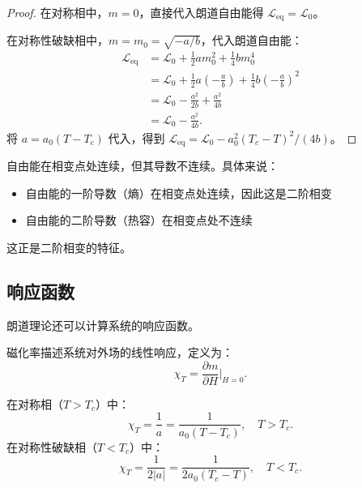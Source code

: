 \begin{proof}
在对称相中，$m = 0$，直接代入朗道自由能得 $\mathcal{L}_{\text{eq}} = \mathcal{L}_0$。

在对称性破缺相中，$m = m_0 = \sqrt{-a/b}$，代入朗道自由能：
\begin{align}
    \mathcal{L}_{\text{eq}} &= \mathcal{L}_0 + \frac{1}{2}a m_0^2 + \frac{1}{4}b m_0^4 \nonumber \\
    &= \mathcal{L}_0 + \frac{1}{2}a \left(-\frac{a}{b}\right) + \frac{1}{4}b \left(-\frac{a}{b}\right)^2 \nonumber \\
    &= \mathcal{L}_0 - \frac{a^2}{2b} + \frac{a^2}{4b} \nonumber \\
    &= \mathcal{L}_0 - \frac{a^2}{4b}.
\end{align}
将 $a = a_0(T - T_c)$ 代入，得到 $\mathcal{L}_{\text{eq}} = \mathcal{L}_0 - a_0^2(T_c - T)^2/(4b)$。
\end{proof}

\begin{note}
自由能在相变点处连续，但其导数不连续。具体来说：
\begin{itemize}
    \item 自由能的一阶导数（熵）在相变点处连续，因此这是二阶相变
    \item 自由能的二阶导数（热容）在相变点处不连续
\end{itemize}
这正是二阶相变的特征。
\end{note}

\subsection{响应函数}

朗道理论还可以计算系统的响应函数。

\begin{definition}[磁化率]
磁化率描述系统对外场的线性响应，定义为：
\begin{equation}
    \chi_T = \frac{\partial m}{\partial H}\bigg|_{H=0}.
\end{equation}
\end{definition}

\begin{theorem}[朗道理论的磁化率]
在对称相（$T > T_c$）中：
\begin{equation}
    \chi_T = \frac{1}{a} = \frac{1}{a_0(T - T_c)}, \quad T > T_c.
\end{equation}
在对称性破缺相（$T < T_c$）中：
\begin{equation}
    \chi_T = \frac{1}{2|a|} = \frac{1}{2a_0(T_c - T)}, \quad T < T_c.
\end{equation}
\end{theorem}

